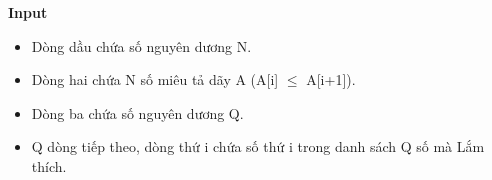 \textbf{Input
}
\begin{itemize}
	\item Dòng dầu chứa số nguyên dương N.
	\item Dòng hai chứa N số miêu tả dãy A (A[i]  $\le$  A[i+1]).
	\item Dòng ba chứa số nguyên dương Q.
	\item Q dòng tiếp theo, dòng thứ i chứa số thứ i trong danh sách Q số mà Lắm thích.
\end{itemize}